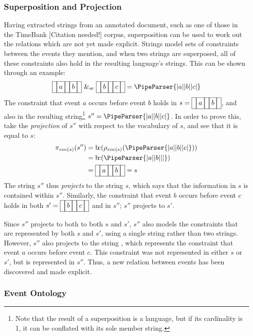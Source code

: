\documentclass[a4paper,12pt,leqno]{article}
\newcommand{\bc}{{\rm b\!c}}
\newcommand{\vph}[1]{\vphantom{#1}}
\newcommand{\ebox}[1]{\fbox{$\vph{'(),}#1$}}
\newcommand{\nbBefore}[2]{\ebox{#1}\ebox{}\ebox{#2}}
\newcommand{\Before}[2]{\ebox{}\nbBefore{#1}{#2}\ebox{}}
\newcommand{\spvc}{~\&_{v\!c}~}
\newcommand{\EventString}[1]{
	\renewcommand*{\do}[1]{\ebox{##1}}%
	\PipeParser{#1}
}
\newcommand{\citeneeded}[1][]{{\color{red}[Citation needed!#1]}}
\begin{document}
\subsubsection{Superposition and Projection}\label{ssub:superposition}
Having extracted strings from an annotated document, such as one of those in the TimeBank \citeneeded{} corpus, superposition can be used to work out the relations which are not yet made explicit. Strings model sets of constraints between the events they mention, and when two strings are superposed, all of these constraints also hold in the resulting language's strings. This can be shown through an example:
\begin{align}
\Before{a}{b} \spvc \Before{b}{c} = \EventString{{}|a|{}|b|{}|c|{}}
\end{align}
The constraint that event $a$ occurs before event $b$ holds in $s = \Before{a}{b}$, and also in the resulting string\footnote{Note that the result of a superposition is a language, but if its cardinality is 1, it can be conflated with its sole member string.} $s'' = \EventString{{}|a|{}|b|{}|c|{}}$. In order to prove this, take the \textit{projection} of $s''$ with respect to the vocabulary of $s$, and see that it is equal to $s$:
\begin{align}
\pi_{voc(s)}(s'') &= \bc(\rho_{voc(s)}(\EventString{{}|a|{}|b|{}|c|{}}))\\ \notag
				  &= \bc(\EventString{{}|a|{}|b|{}|{}|{}})\\ \notag
				  &= \Before{a}{b} = s
\end{align}
The string $s''$ thus \textit{projects} to the string $s$, which says that the information in $s$ is contained within $s''$. Similarly, the constraint that event $b$ occurs before event $c$ holds in both $s' = \Before{b}{c}$ and in $s''$; $s''$ projects to $s'$.

Since $s''$ projects to both to both $s$ and $s'$, $s''$ also models the constraints that are represented by both $s$ and $s'$, using a single string rather than two strings. However, $s''$ also projects to the string \Before{a}{c}, which represents the constraint that event $a$ occurs before event $c$. This constraint was not represented in either $s$ or $s'$, but is represented in $s''$. Thus, a new relation between events has been discovered and made explicit. 


\subsubsection{Event Ontology}\label{ssub:ontology}
\end{document}
